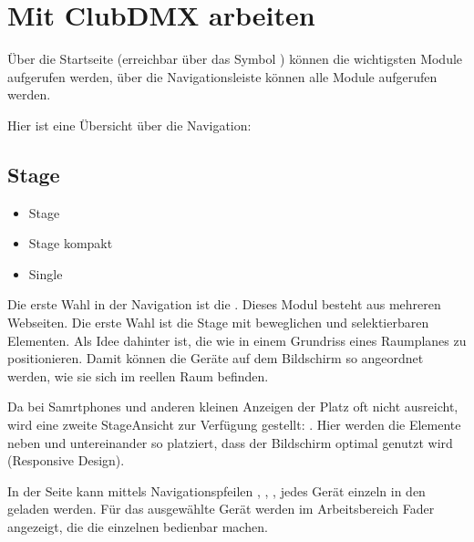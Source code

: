 \documentclass[letterpaper,10pt,ngerman]{sphinxmanual}
\begin{document}
\chapter{Mit ClubDMX arbeiten}
\label{\detokenize{arbeiten:mit-clubdmx-arbeiten}}\label{\detokenize{arbeiten:arbeiten-label}}\label{\detokenize{arbeiten::doc}}
Über die Startseite (erreichbar über das Symbol ) können die
wichtigsten Module aufgerufen werden, über die Navigationsleiste
können alle Module aufgerufen werden.

Hier ist eine Übersicht über die Navigation:


\section{Stage}
\label{\detokenize{arbeiten:stage}}\begin{itemize}
\item {} 
Stage

\item {} 
Stage kompakt

\item {} 
Single

\end{itemize}

Die erste Wahl in der Navigation ist die . Dieses Modul besteht aus
mehreren Webseiten. Die erste Wahl ist die Stage mit beweglichen und
selektierbaren Elementen. Als Idee dahinter ist, die 
wie in einem Grundriss eines Raumplanes zu positionieren. Damit können
die Geräte auf dem Bildschirm so angeordnet werden, wie sie sich im reellen
Raum befinden.

\noindent{}

Da bei Samrtphones und anderen kleinen Anzeigen der Platz oft nicht
ausreicht, wird eine zweite Stage\sphinxhyphen{}Ansicht zur Verfügung gestellt:
. Hier werden die Elemente neben\sphinxhyphen{} und untereinander so
platziert, dass der Bildschirm optimal genutzt wird (Responsive Design).

\noindent{}

In der  Seite kann mittels Navigationspfeilen \sphinxcode{\sphinxupquote{\textless{}\textless{}}},
\sphinxcode{\sphinxupquote{\textless{}}}, \sphinxcode{\sphinxupquote{\textgreater{}}}, \sphinxcode{\sphinxupquote{\textgreater{}\textgreater{}}} jedes Gerät
einzeln in den {\hyperref[\detokenize{grundlagen:topcuelabel}]{}} geladen werden.
Für das ausgewählte Gerät werden im
Arbeitsbereich Fader angezeigt, die die einzelnen 
bedienbar machen.
\end{document}
